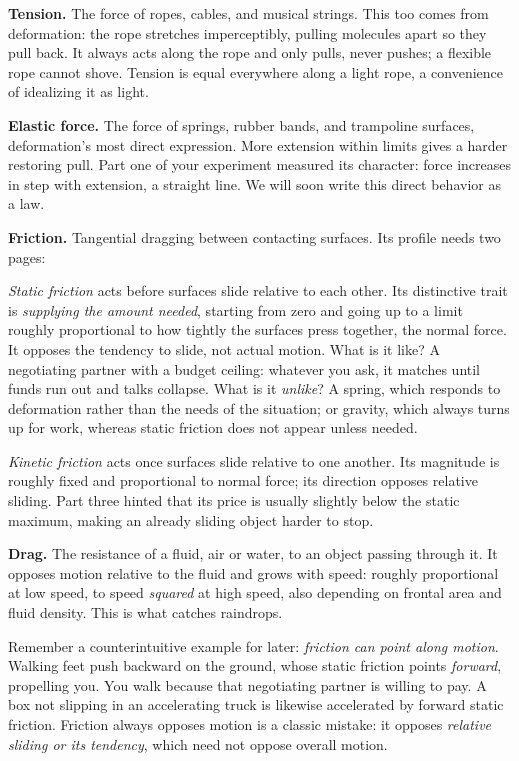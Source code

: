 \textbf{Tension.} The force of ropes, cables, and musical strings. This too comes from deformation: the rope stretches imperceptibly, pulling molecules apart so they pull back. It always acts along the rope and only pulls, never pushes; a flexible rope cannot shove. Tension is equal everywhere along a light rope, a convenience of idealizing it as light.

\textbf{Elastic force.} The force of springs, rubber bands, and trampoline surfaces, deformation's most direct expression. More extension within limits gives a harder restoring pull. Part one of your experiment measured its character: force increases in step with extension, a straight line. We will soon write this direct behavior as a law.

\textbf{Friction.} Tangential dragging between contacting surfaces. Its profile needs two pages:

\emph{Static friction} acts before surfaces slide relative to each other. Its distinctive trait is \emph{supplying the amount needed}, starting from zero and going up to a limit roughly proportional to how tightly the surfaces press together, the normal force. It opposes the tendency to slide, not actual motion. What is it like? A negotiating partner with a budget ceiling: whatever you ask, it matches until funds run out and talks collapse. What is it \emph{unlike}? A spring, which responds to deformation rather than the needs of the situation; or gravity, which always turns up for work, whereas static friction does not appear unless needed.

\emph{Kinetic friction} acts once surfaces slide relative to one another. Its magnitude is roughly fixed and proportional to normal force; its direction opposes relative sliding. Part three hinted that its price is usually slightly below the static maximum, making an already sliding object harder to stop.

\textbf{Drag.} The resistance of a fluid, air or water, to an object passing through it. It opposes motion relative to the fluid and grows with speed: roughly proportional at low speed, to speed \emph{squared} at high speed, also depending on frontal area and fluid density. This is what catches raindrops.

Remember a counterintuitive example for later: \emph{friction can point along motion}. Walking feet push backward on the ground, whose static friction points \emph{forward}, propelling you. You walk because that negotiating partner is willing to pay. A box not slipping in an accelerating truck is likewise accelerated by forward static friction. Friction always opposes motion is a classic mistake: it opposes \emph{relative sliding or its tendency}, which need not oppose overall motion.

